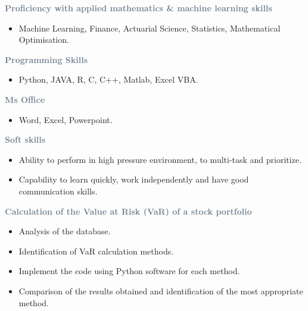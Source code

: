  

\textcolor{SlateGrey}{\textbf{Proficiency with applied mathematics \& machine learning skills}}
\newline

\begin{itemize}
    \item Machine Learning, Finance, Actuarial Science, Statistics, Mathematical Optimisation.
   
\end{itemize}

\textcolor{SlateGrey}{\textbf{Programming Skills}}
\newline

\begin{itemize}
    \item Python, JAVA, R, C, C++, Matlab, Excel VBA.
\end{itemize}


\textcolor{SlateGrey}{\textbf{Ms Office }}
\newline

\begin{itemize}
    \item Word, Excel, Powerpoint.
\end{itemize}

\textcolor{SlateGrey}{\textbf{Soft skills}}
\newline

\begin{itemize}
    \item Ability to perform in high pressure environment, to multi-task and prioritize.

    \item Capability to learn quickly, work independently and have good communication skills.
\end{itemize}


\textcolor{SlateGrey}{\textbf{Calculation of the Value at Risk (VaR) of a stock portfolio}}
\newline

\begin{itemize}
    \item Analysis of the database.
    \item Identification of VaR calculation methods.
    \item Implement the code using Python software for each method.
    \item Comparison of the results obtained and identification of the most appropriate method.

\end{itemize}


